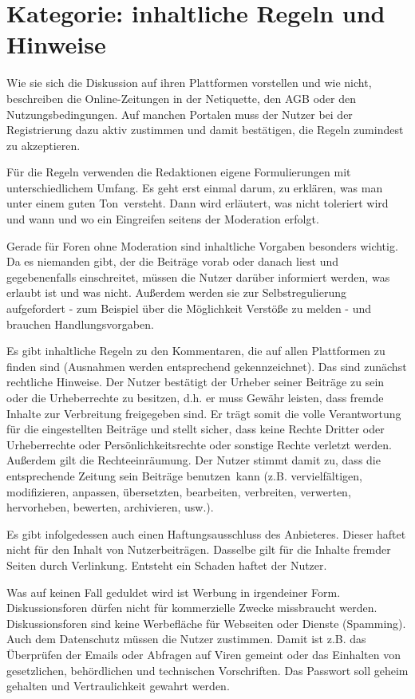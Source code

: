 
\section{Kategorie: \glqq inhaltliche Regeln und Hinweise\grqq}

Wie sie sich die Diskussion auf ihren Plattformen vorstellen und wie nicht,
beschreiben die Online-Zeitungen in der Netiquette, den AGB oder den
Nutzungsbedingungen. Auf manchen Portalen muss der Nutzer bei der Registrierung
dazu aktiv zustimmen und damit bestätigen, die Regeln zumindest zu akzeptieren.

Für die Regeln verwenden die Redaktionen eigene Formulierungen mit
unterschiedlichem Umfang. Es geht erst einmal darum, zu erklären, was man unter
einem \glqq guten Ton\grqq\ versteht. Dann wird erläutert, was nicht toleriert
wird und wann und wo ein Eingreifen seitens der Moderation erfolgt.

Gerade für Foren ohne Moderation sind inhaltliche Vorgaben besonders wichtig. Da
es niemanden gibt, der die Beiträge vorab oder danach liest und gegebenenfalls
einschreitet, müssen die Nutzer darüber informiert werden, was erlaubt ist und
was nicht. Außerdem werden sie zur Selbstregulierung aufgefordert - zum Beispiel
über die Möglichkeit Verstöße zu melden - und brauchen Handlungsvorgaben.

Es gibt inhaltliche Regeln zu den Kommentaren, die auf allen Plattformen zu
finden sind (Ausnahmen werden entsprechend gekennzeichnet).  Das sind zunächst
rechtliche Hinweise. Der Nutzer bestätigt der Urheber seiner Beiträge zu sein
oder die Urheberrechte zu besitzen, d.h. er muss Gewähr leisten, dass fremde
Inhalte zur Verbreitung freigegeben sind. Er trägt somit die volle Verantwortung
für die eingestellten Beiträge und stellt sicher, dass keine Rechte Dritter oder
Urheberrechte oder Persönlichkeitsrechte oder sonstige Rechte verletzt werden.
Außerdem gilt die Rechteeinräumung. Der Nutzer stimmt damit zu, dass die
entsprechende Zeitung sein Beiträge \glqq benutzen\grqq\ kann (z.B. vervielfältigen,
modifizieren, anpassen, übersetzten, bearbeiten, verbreiten, verwerten,
hervorheben, bewerten, archivieren, usw.).

Es gibt infolgedessen auch einen Haftungsausschluss des Anbieteres. Dieser
haftet nicht für den Inhalt von Nutzerbeiträgen. Dasselbe gilt für die Inhalte
fremder Seiten durch Verlinkung. Entsteht ein Schaden haftet der Nutzer.

Was auf keinen Fall geduldet wird ist Werbung in irgendeiner Form.
Diskussionsforen dürfen nicht für kommerzielle Zwecke missbraucht werden.
Diskussionsforen sind keine Werbefläche für Webseiten oder Dienste (Spamming).
Auch dem Datenschutz müssen die Nutzer zustimmen. Damit ist z.B. das Über\-prü\-fen
der Emails oder Abfragen auf Viren gemeint oder das Einhalten von gesetzlichen,
behördlichen und technischen Vorschriften. Das Passwort soll geheim gehalten und
Vertraulichkeit gewahrt werden.


